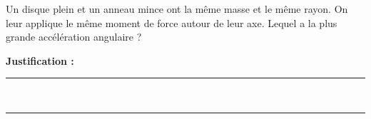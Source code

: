 Un disque plein et un anneau mince ont la même masse et le même rayon. On leur applique le même moment de force autour de leur axe. Lequel a la plus grande accélération angulaire ?

\choices

\noindent\textbf{Justification :} \hrulefill \\[2.5ex]
\rule{\linewidth}{0.4pt} \\[2.5ex]
\rule{\linewidth}{0.4pt}
\vfill
